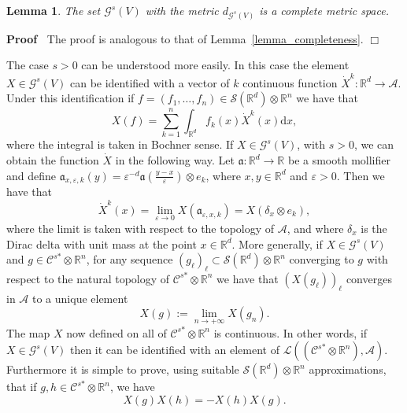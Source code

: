 \documentclass{article}
\newcommand{\assign}{:=}
\newcommand{\asterisk}{\mathord{*}}
\newcommand{\mathd}{\mathrm{d}}
\newenvironment{proof}{\noindent\textbf{Proof\ }}{\hspace*{\fill}$\Box$\medskip}
\newtheorem{lemma}[theorem]{Lemma}
\begin{document}
\begin{lemma}
  The set $\mathcal{G}^s (V)$ with the metric $d_{\mathcal{G}^s (V)}$ is a
  complete metric space.
\end{lemma}

\begin{proof}
  The proof is analogous to that of Lemma~\ref{lemma_completeness}.
\end{proof}

The case $s > 0$ can be understood more easily. In this case the element $X
\in \mathcal{G}^s (V)$ can be identified with a vector of $k$ continuous
function $\dot{X}^k : \mathbb{R}^d \rightarrow \mathcal{A}$. Under this
identification if $f = (f_1, \ldots, f_n) \in \mathcal{S} (\mathbb{R}^d)
\otimes \mathbb{R}^n$ we have that
\[ X (f) = \sum_{k = 1}^n \int_{\mathbb{R}^d} f_k (x) \dot{X}^k (x) \mathd x,
\]
where the integral is taken in Bochner sense. If $X \in \mathcal{G}^s (V)$,
with $s > 0$, we can obtain the function $\dot{X}$ in the following way. Let
$\mathfrak{a} : \mathbb{R}^d \rightarrow \mathbb{R}$ be a smooth mollifier and
define $\mathfrak{a}_{x, \varepsilon, k} (y) = \varepsilon^{- d} \mathfrak{a}
\left( \frac{y - x}{\varepsilon} \right) \otimes e_k$, where $x, y \in
\mathbb{R}^d$ and $\varepsilon > 0$. Then we have that
\[ \dot{X}^k (x) = \lim_{\varepsilon \rightarrow 0} X
   (\mathfrak{a}_{\varepsilon, x, k}) = X (\delta_x \otimes e_k), \]
where the limit is taken with respect to the topology of $\mathcal{A}$, and
where $\delta_x$ is the Dirac delta with unit mass at the point $x \in
\mathbb{R}^d$. More generally, if $X \in \mathcal{G}^s (V)$ and $g \in
\mathcal{C}^{s \asterisk} \otimes \mathbb{R}^n$, for any sequence
$(g_{\ell})_{\ell} \subset \mathcal{S} (\mathbb{R}^d) \otimes \mathbb{R}^n$
converging to $g$ with respect to the natural topology of $\mathcal{C}^{s
\asterisk} \otimes \mathbb{R}^n$ we have that $(X (g_{\ell}))_{\ell}$
converges in $\mathcal{A}$ to a unique element
\[ X (g) \assign \lim_{n \rightarrow + \infty} X (g_n) . \]
The map $X$ now defined on all of $\mathcal{C}^{s \asterisk} \otimes
\mathbb{R}^n$ is continuous. In other words, if $X \in \mathcal{G}^s (V)$ then
it can be identified with an element of $\mathcal{L} ((\mathcal{C}^{s
\asterisk} \otimes \mathbb{R}^n), \mathcal{A})$. Furthermore it is simple to
prove, using suitable $\mathcal{S} (\mathbb{R}^d) \otimes \mathbb{R}^n$
approximations, that if $g, h \in \mathcal{C}^{s \asterisk} \otimes
\mathbb{R}^n$, we have
\begin{equation}
  X (g) X (h) = - X (h) X (g) . \label{eq:anticomgeneral}
\end{equation}
\end{document}
